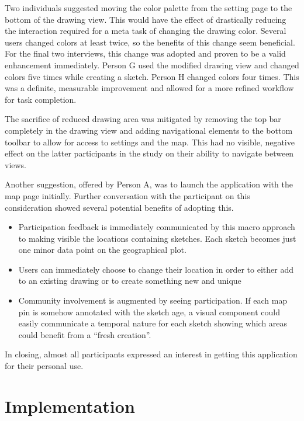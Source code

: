 \documentclass{chi2009}
\begin{document}
Two individuals suggested moving the color palette from the setting page to the
bottom of the drawing view.  This would have the effect of drastically reducing
the interaction required for a meta task of changing the drawing color.  Several
users changed colors at least twice, so the benefits of this change seem
beneficial.  For the final two interviews, this change was adopted and proven
to be a valid enhancement immediately.  Person G used the modified drawing view
and changed colors five times while creating a sketch.  Person H changed colors
four times.  This was a definite, measurable improvement and allowed for a more
refined workflow for task completion.

The sacrifice of reduced drawing area was mitigated by removing the top bar
completely in the drawing view and adding navigational elements to the bottom
toolbar to allow for access to settings and the map.  This had no visible,
negative effect on the latter participants in the study on their ability to
navigate between views.

Another suggestion, offered by Person A, was to launch the application with the
map page initially.  Further conversation with the participant on this
consideration showed several potential benefits of adopting this.
\begin{itemize}
\item Participation feedback is immediately communicated by this macro approach
to making visible the locations containing sketches.  Each sketch becomes just
one minor data point on the geographical plot.
\item Users can immediately choose to change their location in order to either
add to an existing drawing or to create something new and unique
\item Community involvement is augmented by seeing participation.  If each map
pin is somehow annotated with the sketch age, a visual component could easily
communicate a temporal nature for each sketch showing which areas could benefit
from a ``fresh creation''.
\end{itemize}

In closing, almost all participants expressed an interest in getting this
application for their personal use.  



\section{Implementation}
\end{document}
